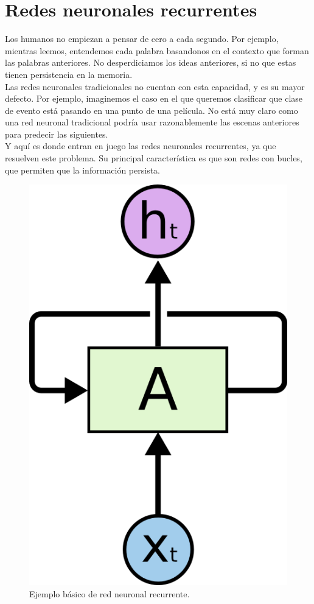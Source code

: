\section{Redes neuronales recurrentes}
Los humanos no empiezan a pensar de cero a cada segundo. Por ejemplo, mientras leemos, entendemos cada palabra basandonos en el contexto que forman las palabras anteriores. No desperdiciamos los ideas anteriores, si no que estas tienen persistencia en la memoria.\\
Las redes neuronales tradicionales no cuentan con esta capacidad, y es su mayor defecto. Por ejemplo, imaginemos el caso en el que queremos clasificar que clase de evento está pasando en una punto de una película. No está muy claro como una red neuronal tradicional podría usar razonablemente las escenas anteriores para predecir las siguientes.\\
Y aquí es donde entran en juego las redes neuronales recurrentes, ya que resuelven este problema. Su principal característica es que son redes con bucles, que permiten que la información persista.\\
\begin{figure}[htp]
\centering
\vspace{-1.5em}
\includegraphics[scale=0.3]{images/rnnrolled.png}
\caption{Ejemplo básico de red neuronal recurrente.}
\end{figure}
